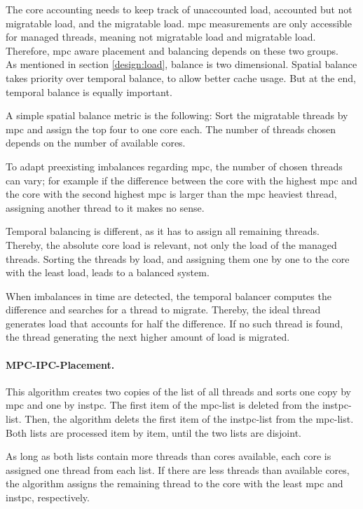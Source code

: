 The core accounting needs to keep track of unaccounted load, accounted but
not migratable load, and the migratable load.
\Gls{mpc} measurements are only accessible for managed threads, meaning not
migratable load and migratable load.
Therefore, \gls{mpc} aware placement and balancing depends on these two
groups.
\\

As mentioned in section \ref{design:load}, balance is two dimensional.
Spatial balance takes priority over temporal balance, to allow better cache usage.
But at the end, temporal balance is equally important.

A simple spatial balance metric is the following: Sort the migratable threads by
\gls{mpc} and assign the top four to one core each.
The number of threads chosen depends on the number of available cores.

To adapt preexisting imbalances regarding \gls{mpc},  the number of chosen
threads can vary; for example if the difference between the core with the
highest \gls{mpc} and the core with the second highest \gls{mpc} is larger than
the \gls{mpc} heaviest thread, assigning another thread to it makes no sense.

Temporal balancing is different, as it has to assign all remaining threads.
Thereby, the absolute core load is relevant, not only the load of the managed
threads.
Sorting the threads by load, and assigning them one by one to the
core with the least load, leads to a balanced system.

When imbalances in time are detected, the temporal balancer computes the difference
and searches for a thread to migrate.
Thereby, the ideal thread generates load that accounts for half the difference.
If no such thread is found, the thread generating the next higher amount of
load is migrated.


\paragraph{MPC-IPC-Placement.}
This algorithm creates two copies of the list of all threads and sorts one copy
by \gls{mpc} and one by \gls{instpc}.
The first item of the \gls{mpc}-list is deleted from the
\gls{instpc}-list.
Then, the algorithm delets the first item of the  \gls{instpc}-list from the
\gls{mpc}-list.
Both lists are processed item by item, until the two lists are disjoint.

As long as both lists contain more threads than cores available, each core
is assigned one thread from each list.
If there are less threads than available cores, the algorithm assigns the
remaining thread to the core with the least \gls{mpc} and \gls{instpc},
respectively.

